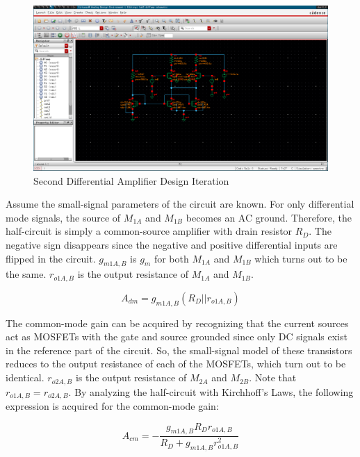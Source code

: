 \FloatBarrier

\begin{figure}[h!]
	\centering
	\includegraphics[scale=0.35]{./images/diff_amp_2.PNG}
	\caption{Second Differential Amplifier Design Iteration}
	\label{fig:diff_amp_2}
\end{figure}

\FloatBarrier

Assume the small-signal parameters of the circuit are known.
For only differential mode signals, the source of $M_{1A}$ and $M_{1B}$ becomes an AC ground.
Therefore, the half-circuit is simply a common-source amplifier with drain resistor $R_{D}$.
The negative sign disappears since the negative and positive differential inputs are flipped in the circuit.
$g_{m1A,B}$ is $g_{m}$ for both $M_{1A}$ and $M_{1B}$ which turns out to be the same.
$r_{o1A,B}$ is the output resistance of $M_{1A}$ and $M_{1B}$.

\begin{equation}
	\label{eq:dm_gain}
	A_{dm} = g_{m1A,B} ( R_{D} || r_{o1A,B} )
\end{equation}

The common-mode gain can be acquired by recognizing that the current sources act as MOSFETs with the gate and source grounded since only DC signals exist in the reference part of the circuit.
So, the small-signal model of these transistors reduces to the output resistance of each of the MOSFETs, which turn out to be identical.
$r_{o2A,B}$ is the output resistance of $M_{2A}$ and $M_{2B}$.
Note that $r_{o1A,B} = r_{o2A,B}$.
By analyzing the half-circuit with Kirchhoff's Laws, the following expression is acquired for the common-mode gain:

\begin{equation}
	\label{eq:cm_gain}
	A_{cm} = - \frac{ g_{m1A,B} R_{D} r_{o1A,B} }{ R_{D} + g_{m1A,B} r_{o1A,B}^{2} }
\end{equation}

